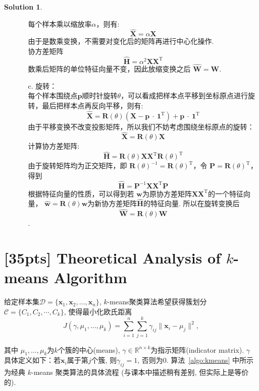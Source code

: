 \documentclass[a4paper,UTF8]{article}
\numberwithin{equation}{section}
\numberwithin{equation}{section}
\theoremstyle{definition}
\newtheorem*{solution}{Solution}
\begin{document}
\begin{solution}
\begin{enumerate}
\begin{enumerate}
            每个样本乘以缩放率$\alpha$，则有: 
            $$\hat{\mathbf{X}}=\alpha \mathbf{X}$$
            由于是数乘变换，不需要对变化后的矩阵再进行中心化操作.\\
            协方差矩阵$$\hat{\mathbf{H}}=\alpha^2 \mathbf{X}\mathbf{X}^\mathrm{T}$$数乘后矩阵的单位特征向量不变，因此放缩变换之后 $\hat{\mathbf{W}}=\mathbf{W}$.
            \item [c. ] 旋转： \\
            每个样本围绕点$\boldsymbol{p}$顺时针旋转$\theta$，可以看成把样本点平移到坐标原点进行旋转，最后把样本点再反向平移，则有:
            $$\hat{\mathbf{X}}=\mathbf{R}(\theta)(\mathbf{X}-\boldsymbol{p}\ \cdot \ \mathbf{1}^\mathrm{T}) + \boldsymbol{p}\ \cdot \ \mathbf{1}^\mathrm{T}$$
            由于平移变换不改变投影矩阵，所以我们不妨考虑围绕坐标原点的旋转：
            $$\hat{\mathbf{X}}=\mathbf{R}(\theta)\mathbf{X}$$
            计算协方差矩阵:
            $$\hat{\mathbf{H}}=\mathbf{R}(\theta)\mathbf{X}\mathbf{X}^\mathrm{T}\mathbf{R}(\theta)^\mathrm{T}$$
            由于旋转矩阵均为正交矩阵，即 $\mathbf{R}(\theta)^{-1}=\mathbf{R}(\theta)^\mathrm{T}$，令 $\mathbf{P}=\mathbf{R}(\theta)^\mathrm{T}$，得到 $$\hat{\mathbf{H}}=\mathbf{P}^{-1}\mathbf{X}\mathbf{X}^\mathrm{T}\mathbf{P}$$根据特征向量的性质，可以得到若 $\boldsymbol{w}$为原协方差矩阵$\mathbf{X X}^{\mathrm{T}}$的一个特征向量， $\hat{\boldsymbol{w}}=\mathbf{R}(\theta)\boldsymbol{w}$为新协方差矩阵$\hat{\mathbf{H}}$的特征向量. 所以在旋转变换后 $$\hat{\mathbf{W}}=\mathbf{R}(\theta)\mathbf{W}$$.
        \end{enumerate}
    \end{enumerate}
\end{solution}

\newpage



\section{[35pts] Theoretical Analysis of $k$-means Algorithm}
给定样本集$\mathcal{D} = \{ \mathbf x_1,\mathbf x_2, \ldots, \mathbf x_n \}$, $k$-means聚类算法希望获得簇划分$\mathcal{C}=\{C_1,C_2,\cdots,C_k\}$, 使得最小化欧氏距离
\begin{equation}
\label{eq-kmeans-l2}
J(\gamma, \mu_1,\ldots,\mu_k) = \sum_{i=1}^n \sum_{j=1}^k \gamma_{ij}\|\mathbf x_i - \mu_j\|^2,
\end{equation}

其中 $\mu_1, \ldots, \mu_k$为$k$个簇的中心(means), $\gamma \in \mathbb{R}^{n\times k}$为指示矩阵(indicator matrix). $\gamma$ 具体定义如下：若$\mathbf x_i$属于第$j$个簇, 则$\gamma_{ij} = 1$, 否则为0.
算法~\ref{algo:kmeans} 中所示为经典 $k$-means 聚类算法的具体流程 (与课本中描述稍有差别, 但实际上是等价的).
\end{document}
